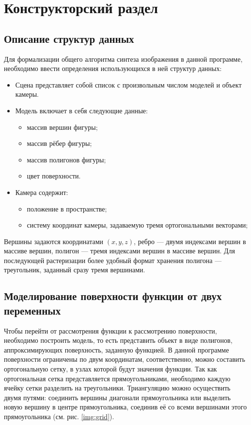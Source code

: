 \chapter{Конструкторский раздел}

\section{Описание структур данных}

Для формализации общего алгоритма синтеза изображения в данной программе, необходимо ввести определения использующихся в ней структур данных:
\begin{itemize}
	\item Сцена представляет собой список с произвольным числом моделей и объект камеры.
	\item Модель включает в себя следующие данные: \begin{itemize}
		\item массив вершин фигуры;
		\item массив рёбер фигуры;
		\item массив полигонов фигуры;
		\item цвет поверхности.
	\end{itemize}
	\item Камера содержит: \begin{itemize}
		\item положение в пространстве;
		\item систему координат камеры, задаваемую тремя ортогональными векторами;
	\end{itemize}
\end{itemize}

Вершины задаются координатами $(x, y, z)$, ребро — двумя индексами вершин в массиве вершин, полигон — тремя индексами вершин в массиве вершин.
Для последующей растеризации более удобный формат хранения полигона — треугольник, заданный сразу тремя вершинами.

\section{Моделирование поверхности функции от двух переменных}

Чтобы перейти от рассмотрения функции к рассмотрению поверхности, необходимо построить модель, то есть представить объект в виде полигонов, аппроксимирующих поверхность, заданную функцией.
В данной программе поверхности ограничены по двум координатам, соответственно, можно составить ортогональную сетку, в узлах которой будут значения функции.
Так как ортогональная сетка представляется прямоугольниками, необходимо каждую ячейку сетки разделить на треугольники.
Триангуляцию можно осуществить двумя путями: соединить вершины диагонали прямоугольника или выделить новую вершину в центре прямоугольника, соединив её со всеми вершинами этого прямоугольника (см. рис. \ref{img:grid}).

